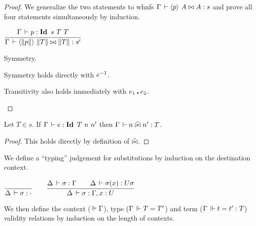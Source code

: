 \documentclass[a4paper,english]{lipics-utf8x}
\begin{document}
  \begin{proof}
    We generalize the two statements to whnfs
    $\Gamma \,\vdash \langle p \rangle~ A \mathrel{\bowtie} A : s$ and
    prove all four statements simultaneously by induction.

    \begin{center}
    \(
      \ru{\Gamma \der p : \Id s\ T\ T
        }{\Gamma \der \hideq{\squash{p}} \squash{T} \Er \squash{T} : s'}
    \)
    \end{center}

    \begin{caselist}
      \nextcase Symmetry.
      \begin{mathc}
      \end{mathc}
      Symmetry holds directly with $e^{-1}$.

      \nextcase Transitivity also holds immediately with $e_1 \centerdot e_2$.
    \end{caselist}
  \end{proof}

  \begin{lemma}
    Let $T \in s$.
    If $\Gamma \,\vdash e : \operatorname{\mathbf{Id}~} T\ n\ n'$ then $\Gamma \,\vdash n \mathrel{\widehat{\bowtie}} n' : T$.
  \end{lemma}

  \begin{proof}
    This holds directly by definition of $\mathrel{\widehat{\bowtie}}$.
  \end{proof}


  We define a ``typing'' judgement for substitutions by induction on the
  destination context.
  \begin{center}
  \(
    \ru{}{\Delta \der \sigma : \cdot}
    \qquad
    \ru{\Delta \der \sigma : \Gamma \qquad
        \Delta \der \sigma(x) : U \sigma
      }{\Delta \der \sigma : \Gamma, x:U}
  \)
  \end{center}

  We then define the context ($\,\Vdash \Gamma$), type ($\Gamma \,\Vdash T = T'$) and
  term ($\Gamma \,\Vdash t = t' : T$) validity relations by induction on the length
  of contexts.

  \begin{mathc}
    \ru{}{\Der \cdot}
    \qquad
    \qquad
    \qquad
  \end{mathc}
\end{document}
